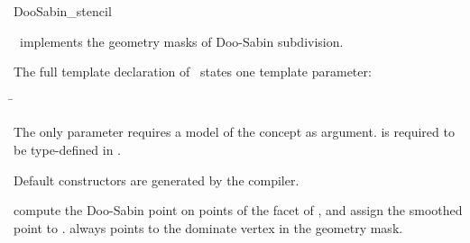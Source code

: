 \begin{ccRefClass}{DooSabin_stencil}

\ccDefinition

\ccClassTemplateName\ implements the geometry masks of 
Doo-Sabin subdivision. 


\ccParameters

The full template declaration of \ccClassTemplateName\ states one
template parameter:

\begin{tabbing}
 \= 
\end{tabbing}
   
The only parameter requires a model of 
the  concept as argument. 
 is required to be type-defined in .

\ccCreation

Default constructors are generated by the compiler.

\ccThree{}{}{}

{compute the Doo-Sabin point on points of the facet of , 
and assign the smoothed point to .  always 
points to the dominate vertex in the geometry mask.}


\ccSeeAlso

\\
\\

\end{ccRefClass}

\ccRefPageEnd


